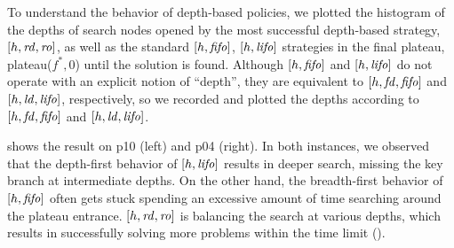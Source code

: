 To understand the behavior of depth-based policies, we plotted the histogram of
the depths of search nodes opened by
the most successful depth-based strategy, $[h,{\mbox{\textit{rd}}},{\mbox{\textit{ro}}}]$, as well as 
the standard $[h,{\mbox{\textit{fifo}}}]$, $[h,{\mbox{\textit{lifo}}}]$ strategies
in the final plateau, plateau($f^*,0$) until the solution is found.
% 
Although $[h,{\mbox{\textit{fifo}}}]$ and $[h,{\mbox{\textit{lifo}}}]$ do not operate with an explicit notion of ``depth'', 
they are equivalent to $[h,{\mbox{\textit{fd}}},{\mbox{\textit{fifo}}}]$ and $[h,{\mbox{\textit{ld}}},{\mbox{\textit{lifo}}}]$, respectively,
so we recorded and plotted the depths according to  $[h,{\mbox{\textit{fd}}},{\mbox{\textit{fifo}}}]$ and $[h,{\mbox{\textit{ld}}},{\mbox{\textit{lifo}}}]$.


 shows the result
on
  p10 (left) and
  p04 (right).
In both instances, 
we observed that the depth-first behavior of $[h,{\mbox{\textit{lifo}}}]$ results in 
deeper search, missing the key branch at intermediate depths.
On the other hand, the breadth-first behavior of $[h,{\mbox{\textit{fifo}}}]$ often gets stuck spending an excessive amount of time searching around the plateau entrance.
$[h,{\mbox{\textit{rd}}},{\mbox{\textit{ro}}}]$ is balancing the search at various depths, which results in successfully solving more problems within the time limit (). %


